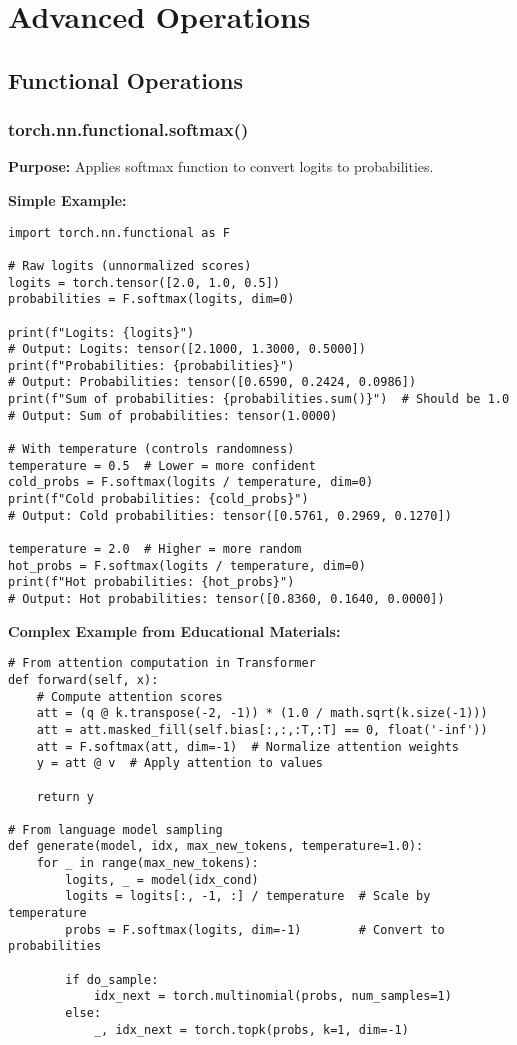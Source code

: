 \documentclass[11pt,a4paper]{book}
\begin{document}
\chapter{Advanced Operations}

\section{Functional Operations}

\subsection{torch.nn.functional.softmax()}

\textbf{Purpose:} Applies softmax function to convert logits to probabilities.

\textbf{Simple Example:}
\begin{verbatim}
import torch.nn.functional as F

# Raw logits (unnormalized scores)
logits = torch.tensor([2.0, 1.0, 0.5])
probabilities = F.softmax(logits, dim=0)

print(f"Logits: {logits}")
# Output: Logits: tensor([2.1000, 1.3000, 0.5000])
print(f"Probabilities: {probabilities}")
# Output: Probabilities: tensor([0.6590, 0.2424, 0.0986])
print(f"Sum of probabilities: {probabilities.sum()}")  # Should be 1.0
# Output: Sum of probabilities: tensor(1.0000)

# With temperature (controls randomness)
temperature = 0.5  # Lower = more confident
cold_probs = F.softmax(logits / temperature, dim=0)
print(f"Cold probabilities: {cold_probs}")
# Output: Cold probabilities: tensor([0.5761, 0.2969, 0.1270])

temperature = 2.0  # Higher = more random
hot_probs = F.softmax(logits / temperature, dim=0)
print(f"Hot probabilities: {hot_probs}")
# Output: Hot probabilities: tensor([0.8360, 0.1640, 0.0000])
\end{verbatim}

\textbf{Complex Example from Educational Materials:}
\begin{verbatim}
# From attention computation in Transformer
def forward(self, x):
    # Compute attention scores
    att = (q @ k.transpose(-2, -1)) * (1.0 / math.sqrt(k.size(-1)))
    att = att.masked_fill(self.bias[:,:,:T,:T] == 0, float('-inf'))
    att = F.softmax(att, dim=-1)  # Normalize attention weights
    y = att @ v  # Apply attention to values
    
    return y

# From language model sampling
def generate(model, idx, max_new_tokens, temperature=1.0):
    for _ in range(max_new_tokens):
        logits, _ = model(idx_cond)
        logits = logits[:, -1, :] / temperature  # Scale by temperature
        probs = F.softmax(logits, dim=-1)        # Convert to probabilities
        
        if do_sample:
            idx_next = torch.multinomial(probs, num_samples=1)
        else:
            _, idx_next = torch.topk(probs, k=1, dim=-1)
\end{verbatim}
\end{document}
